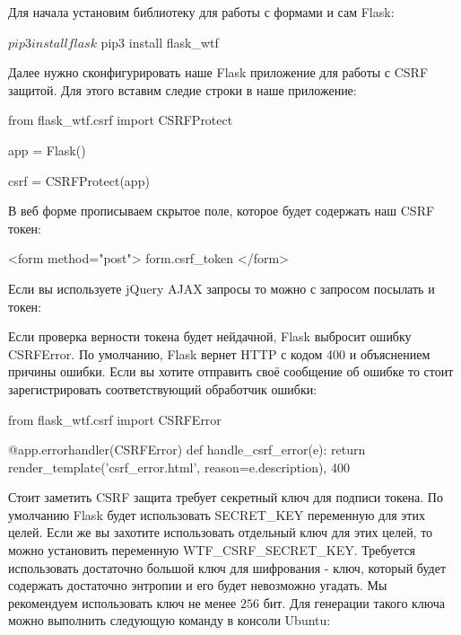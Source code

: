 Для начала установим библиотеку для работы с формами и сам Flask:

\begin{python}
$ pip3 install flask
$ pip3 install flask_wtf
\end{python}

Далее нужно сконфигурировать наше Flask приложение для работы с CSRF
защитой. Для этого вставим следие строки в наше приложение:

\begin{python}
from flask_wtf.csrf import CSRFProtect

app = Flask()

csrf = CSRFProtect(app)
\end{python}

В веб форме прописываем скрытое поле, которое будет содержать наш CSRF токен:

\begin{python}
<form method="post">
    {{ form.csrf_token }}
</form>
\end{python}

Если вы используете jQuery AJAX запросы то можно с запросом посылать и
токен:


Если проверка верности токена будет нейдачной, Flask выбросит ошибку CSRFError. 
По умолчанию, Flask вернет HTTP с кодом 400 и объяснением причины ошибки. Если
вы хотите отправить своё сообщение об ошибке то стоит зарегистрировать соответствующий
обработчик ошибки:

\begin{python}
from flask_wtf.csrf import CSRFError

@app.errorhandler(CSRFError)
def handle_csrf_error(e):
    return render_template('csrf_error.html', reason=e.description), 400
\end{python}

Стоит заметить CSRF защита требует секретный ключ для подписи токена. По умолчанию Flask 
будет использовать SECRET\_KEY переменную для этих целей. Если же вы захотите использовать
отдельный ключ для этих целей, то можно установить переменную WTF\_CSRF\_SECRET\_KEY.
Требуется использовать достаточно большой ключ для шифрования - ключ, который будет
содержать достаточно энтропии и его будет невозможно угадать. Мы рекомендуем использовать
ключ не менее $256$ бит. Для генерации такого ключа можно выполнить следующую команду
в консоли Ubuntu:

